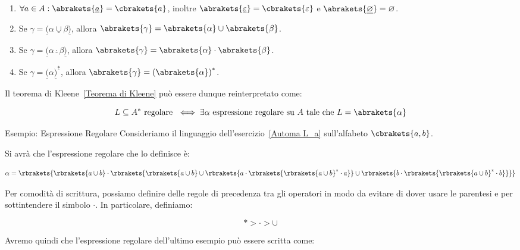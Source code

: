 \begin{enumerate}
  \item \(\forall a \in A: \abrakets{\underline{a}}=\cbrakets{a}\), inoltre \(\abrakets{\underline{\varepsilon}}=\cbrakets{\varepsilon}\) e \(\abrakets{\underline{\varnothing}}=\varnothing\).
  \item Se \(\gamma = \underline{(}\alpha\underline{\cup}\beta\underline{)}\), allora \(\abrakets{\gamma}=\abrakets{\alpha}\cup\abrakets{\beta}\). %
  \item Se \(\gamma = \underline{(}\alpha\underline{\cdot}\beta\underline{)}\), allora \(\abrakets{\gamma}=\abrakets{\alpha}\cdot\abrakets{\beta}\).  %
  \item Se \(\gamma = \underline{(}\alpha\underline{)}^{\underline{*}}\), allora \(\abrakets{\gamma}={(\abrakets{\alpha})}^*\). %
\end{enumerate}

Il teorema di Kleene~\ref{Teorema di Kleene} può essere dunque reinterpretato come:

\begin{equation}
  L \subseteq A^* \text{ regolare } \iff \exists \alpha \text{ espressione regolare su } A \text{ tale che } L=\abrakets{\alpha}
\end{equation}

\begin{generalbox}
  [colframe=azure-gradient-3!90!black]
  {Esempio: Espressione Regolare}
  Consideriamo il linguaggio dell'esercizio~\ref{Automa L_a} sull'alfabeto \(\cbrakets{a,b}\).

  Si avrà che l'espressione regolare che lo definisce è:

  \begin{equation}
    \alpha = \rbrakets{\rbrakets{a \cup b } \cdot \rbrakets{\rbrakets{a \cup b} \cup  \rbrakets{a \cdot \rbrakets{\rbrakets{a \cup b}^* \cdot a}} \cup \rbrakets{b \cdot \rbrakets{\rbrakets{a\cup b}^* \cdot b}}}}
  \end{equation}
\end{generalbox}

Per comodità di scrittura, possiamo definire delle regole di precedenza tra gli operatori in modo da evitare di dover usare le parentesi e per sottintendere il simbolo \(\cdot\). In particolare, definiamo:

\begin{equation}
  * > \cdot > \cup
\end{equation}

Avremo quindi che l'espressione regolare dell'ultimo esempio può essere scritta come:

